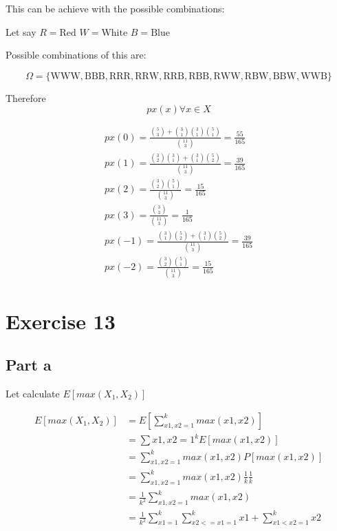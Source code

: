 \documentclass[12pt, a4paper]{article}
\begin{document}
This can be achieve with the possible combinations:

Let say 
$R = \text{Red}$
$W = \text{White}$
$B = \text{Blue}$

Possible combinations of this are:

\begin{equation}
  \Omega = \{\text{WWW}, \text{BBB}, \text{RRR}, \text{RRW}, \text{RRB}, \text{RBB}, \text{RWW}, \text{RBW}, \text{BBW}, \text{WWB}\}
\end{equation}

Therefore
\begin{equation}
  px(x) \forall x \in X
\end{equation}


\begin{subequations}
  \begin{align}
    px(0) = \frac{\binom{5}{3} + \binom{3}{1} \binom{3}{1} \binom{5}{1}}{\binom{11}{3}} = \frac{55}{165} \\
    px(1) = \frac{\binom{3}{2} \binom{3}{1} + \binom{3}{1} \binom{5}{2}}{\binom{11}{3}} = \frac{39}{165} \\
    px(2) = \frac{\binom{3}{2} \binom{5}{1}}{\binom{11}{3}} = \frac{15}{165} \\
    px(3) = \frac{\binom{3}{3}}{\binom{11}{3}} = \frac{1}{165} \\
    px(-1) = \frac{\binom{3}{1} \binom{5}{2} + \binom{3}{1} \binom{5}{2}}{\binom{11}{3}} = \frac{39}{165} \\
    px(-2) = \frac{\binom{3}{2} \binom{5}{1}}{\binom{11}{3}} = \frac{15}{165}
  \end{align}
\end{subequations}

\section{Exercise 13}
\subsection{Part a}

Let calculate $E[max(X_1,X_2)]$

\begin{subequations}
  \begin{align}
    E[max(X_1,X_2)] &= E\left[ \displaystyle\sum_{x1,x2=1}^{k} max(x1,x2) \right] \\
                    &= \displaystyle\sum{x1,x2=1}^{k} E[max(x1,x2)] \\
                    &= \displaystyle\sum_{x1,x2=1}^{k} max(x1,x2)P[max(x1,x2)] \\
                    &= \displaystyle\sum_{x1,x2=1}^{k} max(x1,x2)\frac{1}{k}\frac{1}{k} \\
                    &= \frac{1}{k^2} \displaystyle\sum_{x1,x2=1}^{k} max(x1,x2) \\
                    &= \frac{1}{k^2} \displaystyle\sum_{x1=1}^{k} \displaystyle\sum_{x2<=x1=1}^{k} x1 + \displaystyle\sum_{x1<x2=1}^{k} x2 \label{max:1}
    \end{align}
\end{subequations}
\end{document}
